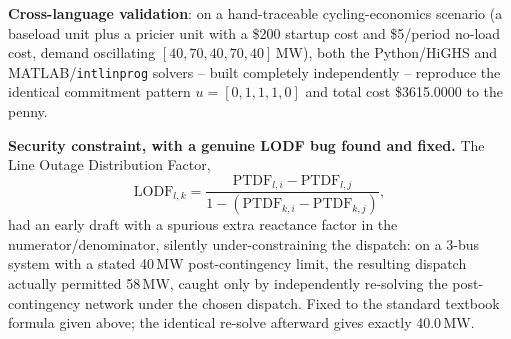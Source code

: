 \documentclass[11pt]{report}
\theoremstyle{plain}
\theoremstyle{definition}
\theoremstyle{remark}
\begin{document}
\textbf{Cross-language validation}: on a hand-traceable cycling-economics
scenario (a baseload unit plus a pricier unit with a \$200 startup cost
and \$5/period no-load cost, demand oscillating $[40,\allowbreak70,\allowbreak40,\allowbreak70,\allowbreak40]$\,MW),
both the Python/HiGHS and MATLAB/\texttt{intlinprog} solvers -- built
completely independently -- reproduce the identical commitment pattern
$u=[0,1,1,1,0]$ and total cost \$3615.0000 to the penny.

\textbf{Security constraint, with a genuine LODF bug found and fixed.}
The Line Outage Distribution Factor,
\begin{equation}
\text{LODF}_{l,k} = \frac{\text{PTDF}_{l,i}-\text{PTDF}_{l,j}}
{1-(\text{PTDF}_{k,i}-\text{PTDF}_{k,j})},
\label{eq:lodf}
\end{equation}
had an early draft with a spurious extra reactance factor in the
numerator/denominator, silently under-constraining the dispatch: on a
3-bus system with a stated 40\,MW post-contingency limit, the resulting
dispatch actually permitted 58\,MW, caught only by independently
re-solving the post-contingency network under the chosen dispatch. Fixed
to the standard textbook formula given above; the identical
re-solve afterward gives exactly 40.0\,MW.
\end{document}
